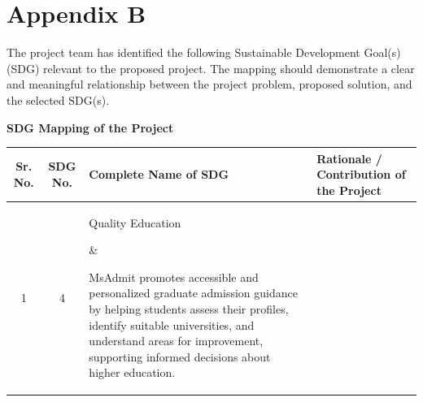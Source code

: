 \chapter*{Appendix B}

\label{app:sdg_mapping}

The project team has identified the following Sustainable Development Goal(s) (SDG) relevant to the proposed project. The mapping should demonstrate a clear and meaningful relationship between the project problem, proposed solution, and the selected SDG(s).

\vspace{0.4cm}

\begin{center}
\textbf{\large SDG Mapping of the Project}
\end{center}

\vspace{0.3cm}


\renewcommand{\arraystretch}{1.4}

\begin{center}
\begin{tabular}{|c|c|p{4.2cm}|p{6.0cm}|}
\hline
\textbf{Sr. No.} &
\textbf{SDG No.} &
\textbf{Complete Name of SDG} &
\textbf{Rationale / Contribution of the Project} \\
\hline

1 &
4 &
\parbox[t]{4.2cm}{
\vspace{0.15cm}
Quality Education
\vspace{1.4cm}
} &
\parbox[t]{6.0cm}{
\vspace{0.15cm}
MsAdmit promotes accessible and personalized graduate admission guidance by helping students assess their profiles, identify suitable universities, and understand areas for improvement, supporting informed decisions about higher education.
\vspace{1.4cm}
}
\\
\hline





\end{tabular}
\end{center}

\vspace{0.5cm}




